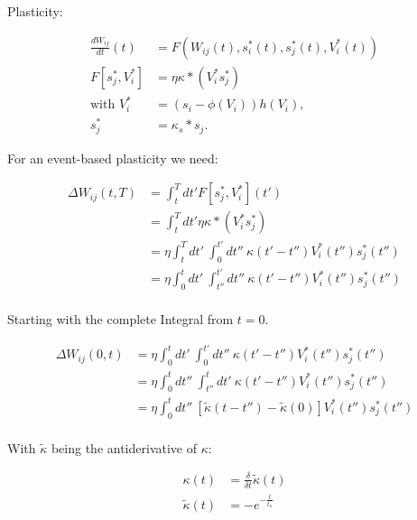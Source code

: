 Plasticity:

\begin{align}
  \frac{dW_{ij}}{dt}(t) & = F(W_{ij}(t), s_i^\ast (t), s_j^\ast (t), V_i^\ast (t)) \\
  F[s_j^\ast, V_i^\ast] & = \eta \kappa \ast (V_i^\ast s_j^\ast)                   \\
  \text{with } V_i^\ast & = (s_i - \phi(V_i )) h(V_i),                             \\
  s_j^\ast              & = \kappa_s \ast s_j.
\end{align}

For an event-based plasticity we need:

\begin{align}
  \Delta W_{ij}(t,T) & = \int_t^T dt' F[s_j^\ast , V_i^\ast ](t')                                                 \\
                     & = \int_t^T dt' \eta \kappa \ast (V_i^\ast s_j^\ast)                                        \\
                     & = \eta \int_t^T dt' \  \int_0^{t'} dt'' \ \kappa(t'-t'') V_i^\ast (t'') s_j^\ast (t'')     \\
                     & = \eta \int_0^t dt' \  \int_{t''}^{t'} dt'' \ \kappa(t'-t'') V_i^\ast (t'') s_j^\ast (t'') \\
\end{align}


Starting with the complete Integral from $t=0$.

\begin{align}
  \Delta W_{ij}(0,t) & =\eta \int_0^t dt' \  \int_0^{t'} dt'' \ \kappa(t'-t'') V_i^\ast (t'') s_j^\ast (t'')                          \\
                     & = \eta \int_0^t dt'' \  \int_{t''}^{t} dt' \ \kappa(t'-t'') V_i^\ast (t'') s_j^\ast (t'')                      \\
                     & = \eta \int_0^t dt'' \  \left[ \tilde{\kappa}(t-t'') - \tilde{\kappa}(0) \right] V_i^\ast (t'') s_j^\ast (t'') \\
\end{align}

With $\tilde{\kappa}$ being the antiderivative of $\kappa$:

\begin{align}
  \kappa(t)         & = \frac{\delta}{\delta t} \tilde{\kappa}(t) \\
  \tilde{\kappa}(t) & = - e^{-\frac{t}{t_{\kappa}}}               \\
\end{align}

